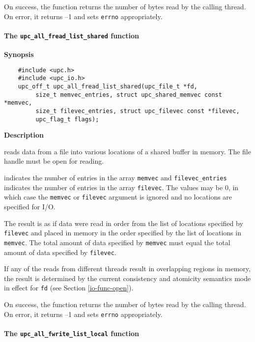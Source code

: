 \np On success, the function returns the number of bytes read by the 
calling
thread. On error, it returns --1 and sets {\tt errno} appropriately.

\paragraph{The {\tt upc\_all\_fread\_list\_shared} function}

{\bf Synopsis}

\npf\vspace{-2.5em} 

\begin{verbatim}
    #include <upc.h>
    #include <upc_io.h>
    upc_off_t upc_all_fread_list_shared(upc_file_t *fd,
         size_t memvec_entries, struct upc_shared_memvec const *memvec,
         size_t filevec_entries, struct upc_filevec const *filevec,
         upc_flag_t flags);
\end{verbatim}

{\bf Description}

 reads data from a file
into various locations of a shared buffer in memory. The file handle must be open for reading.

 indicates the number of entries in the array {\tt memvec} and
{\tt filevec\_entries} indicates the number of entries in the array {\tt filevec}. The
values may be 0, in which case the {\tt memvec} or {\tt filevec} argument is ignored and
no locations are specified for I/O.

\np The result is as if data were read in order from the list of locations
specified by {\tt filevec} and placed in memory in the order specified by the list
of locations in {\tt memvec}. The total amount of data specified by {\tt memvec} must
equal the total amount of data specified by {\tt filevec}.

\np If any of the reads from different threads result in overlapping regions
in memory, the result is determined by the current consistency and atomicity
semantics mode in effect for {\tt fd} (see Section \ref{io-func-open}).

\np On success, the function returns the number of bytes read by the calling
thread. On error, it returns --1 and sets {\tt errno} appropriately.

\paragraph{The {\tt upc\_all\_fwrite\_list\_local} function}

